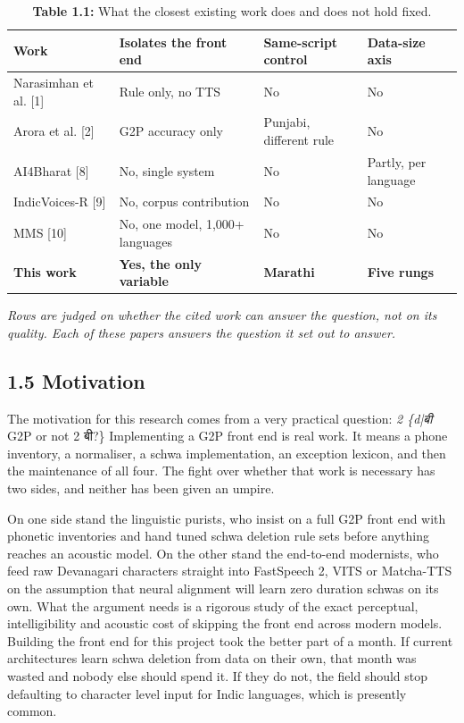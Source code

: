 \documentclass[12pt,a4paper]{article}
\DeclareRobustCommand{\dev}[1]{{\devfont #1}}
\begin{document}
\begin{table}[htbp]
  \centering
  \small
  \caption*{\textbf{Table 1.1:}  What the closest existing work does and does not hold fixed.}
  \begin{tabular}{p{1.82in}p{1.38in}p{1.18in}p{0.93in}}
  \toprule
  \textbf{Work} & \textbf{Isolates the front end} & \textbf{Same-script control} & \textbf{Data-size axis} \\
  \midrule
  Narasimhan et al. [1] & Rule only, no TTS & No & No \\
  Arora et al. [2] & G2P accuracy only & Punjabi, different rule & No \\
  AI4Bharat [8] & No, single system & No & Partly, per language \\
  IndicVoices-R [9] & No, corpus contribution & No & No \\
  MMS [10] & No, one model, 1,000+ languages & No & No \\
  \textbf{This work} & \textbf{Yes, the only variable} & \textbf{Marathi} & \textbf{Five rungs} \\
  \bottomrule
  \end{tabular}
  \par\vspace{3pt}\begin{minipage}{5.95in}\footnotesize\itshape Rows are judged on whether the cited work can answer the question, not on its quality. Each of these papers answers the question it set out to answer.\end{minipage}
\end{table}

\subsection*{1.5  Motivation}
The motivation for this research comes from a very practical question: \textit{2 \{d|बी} G2P or not 2 \dev{बी}?\} Implementing a G2P front end is real work. It means a phone inventory, a normaliser, a schwa implementation, an exception lexicon, and then the maintenance of all four. The fight over whether that work is necessary has two sides, and neither has been given an umpire.

On one side stand the linguistic purists, who insist on a full G2P front end with phonetic inventories and hand tuned schwa deletion rule sets before anything reaches an acoustic model. On the other stand the end-to-end modernists, who feed raw Devanagari characters straight into FastSpeech 2, VITS or Matcha-TTS on the assumption that neural alignment will learn zero duration schwas on its own. What the argument needs is a rigorous study of the exact perceptual, intelligibility and acoustic cost of skipping the front end across modern models. Building the front end for this project took the better part of a month. If current architectures learn schwa deletion from data on their own, that month was wasted and nobody else should spend it. If they do not, the field should stop defaulting to character level input for Indic languages, which is presently common.
\end{document}

